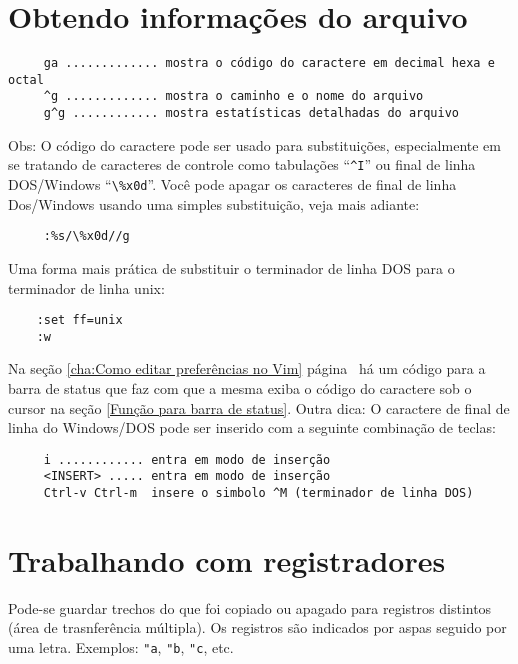 \section{Obtendo informações do arquivo}

\begin{verbatim}
     ga ............. mostra o código do caractere em decimal hexa e octal
     ^g ............. mostra o caminho e o nome do arquivo
     g^g ............ mostra estatísticas detalhadas do arquivo
\end{verbatim}

Obs: O código do caractere pode ser usado para substituições,
especialmente em se tratando de caracteres de controle como tabulações
``\verb|^I|'' ou final de linha DOS/Windows ``\verb|\%x0d|''. Você pode apagar os
caracteres de final de linha Dos/Windows usando uma simples
substituição, veja mais adiante:

\begin{verbatim}
     :%s/\%x0d//g
\end{verbatim}

Uma forma mais prática de substituir o terminador de linha DOS para o
terminador de linha unix:

\begin{verbatim}
    :set ff=unix
    :w
\end{verbatim}

Na seção \ref{cha:Como editar preferências no Vim}
página~\pageref{cha:Como editar preferências no Vim}
há um código para a barra de
status que faz com que a mesma exiba o código do caractere sob o cursor na
seção \ref{Função para barra de status}. Outra dica: O caractere de final de linha
do Windows/DOS pode ser inserido com a seguinte combinação de teclas:

\begin{verbatim}
     i ............ entra em modo de inserção
     <INSERT> ..... entra em modo de inserção
     Ctrl-v Ctrl-m  insere o simbolo ^M (terminador de linha DOS)
\end{verbatim}

\section{Trabalhando com registradores}
\label{Trabalhando com registradores}

Pode-se guardar trechos do que foi copiado ou apagado para
registros distintos (área de trasnferência múltipla).
Os registros são indicados por aspas seguido por uma letra.
Exemplos: {\tt "a}, {\tt "b}, {\tt "c}, etc.



